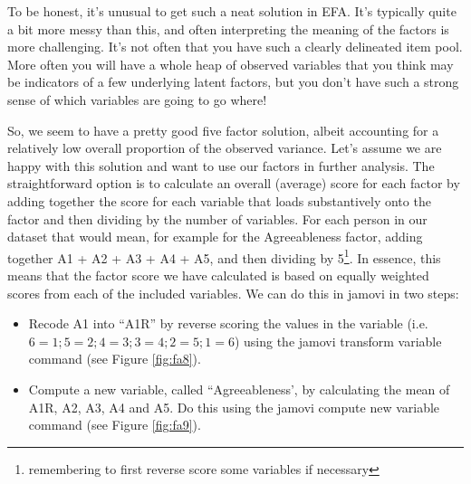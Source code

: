 \documentclass[
]{book}
\providecommand{\tightlist}{%
  \setlength{\itemsep}{0pt}\setlength{\parskip}{0pt}}
\begin{document}
To be honest, it's unusual to get such a neat solution in EFA. It's typically quite a bit more messy than this, and often interpreting the meaning of the factors is more challenging. It's not often that you have such a clearly delineated item pool. More often you will have a whole heap of observed variables that you think may be indicators of a few underlying latent factors, but you don't have such a strong sense of which variables are going to go where!

So, we seem to have a pretty good five factor solution, albeit accounting for a relatively low overall proportion of the observed variance. Let's assume we are happy with this solution and want to use our factors in further analysis. The straightforward option is to calculate an overall (average) score for each factor by adding together the score for each variable that loads substantively onto the factor and then dividing by the number of variables. For each person in our dataset that would mean, for example for the Agreeableness factor, adding together A1 + A2 + A3 + A4 + A5, and then dividing by 5\footnote{remembering to first reverse score some variables if necessary}. In essence, this means that the factor score we have calculated is based on equally weighted scores from each of the included variables. We can do this in jamovi in two steps:

\begin{itemize}
\tightlist
\item
  Recode A1 into ``A1R'' by reverse scoring the values in the variable (i.e.~\(6=1; 5=2; 4=3; 3=4; 2=5; 1=6\)) using the jamovi transform variable command (see Figure \ref{fig:fa8}).
\item
  Compute a new variable, called ``Agreeableness', by calculating the mean of A1R, A2, A3, A4 and A5. Do this using the jamovi compute new variable command (see Figure \ref{fig:fa9}).
\end{itemize}
\end{document}
